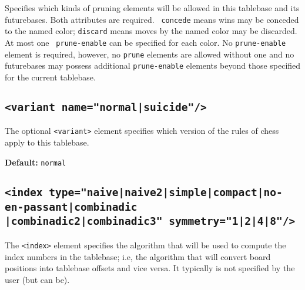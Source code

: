 \documentclass[11pt]{article}
\begin{document}
Specifies which kinds of pruning elements will be allowed in this
tablebase and its futurebases.  Both attributes are required.  {\tt
concede} means wins may be conceded to the named color; {\tt discard}
means moves by the named color may be discarded.  At most one {\tt
prune-enable} can be specified for each color.  No {\tt prune-enable}
element is required, however, no {\tt prune} elements are allowed without
one and no futurebases may possess additional {\tt prune-enable}
elements beyond those specified for the current tablebase.


\subsection{\tt <variant name="normal|suicide"/>}

The optional {\tt <variant>} element specifies which version
of the rules of chess apply to this tablebase.

{\bf Default:} {\tt normal}


\subsection{\tt <index type="naive|naive2|simple|compact|no-en-passant|combinadic \hfil\break\hbox{\qquad} |combinadic2|combinadic3" symmetry="1|2|4|8"/>}

The {\tt <index>} element specifies the algorithm that will be used to
compute the index numbers in the tablebase; i.e, the algorithm that
will convert board positions into tablebase offsets and vice versa.
It typically is not specified by the user (but can be).
\end{document}
